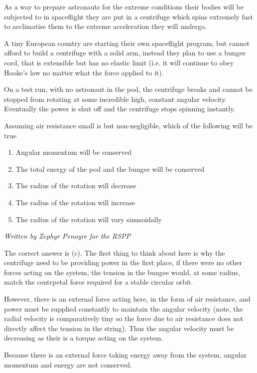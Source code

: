 \begin{problem} 
{
As a way to prepare astronauts for the extreme conditions their bodies will be subjected to in spaceflight they are put in a centrifuge which spins extremely fast to acclimatise them to the extreme acceleration they will undergo.

A tiny European country are starting their own spaceflight program, but cannot afford to build a centrifuge with a solid arm, instead they plan to use a bungee cord, that is extensible but has no elastic limit (i.e. it will continue to obey Hooke's law no matter what the force applied to it).

On a test run, with no astronaut in the pod, the centrifuge breaks and cannot be stopped from rotating at some incredible high, constant angular velocity. Eventually the power is shut off and the centrifuge stops spinning instantly.

Assuming air resistance small is but non-negligible, which of the following will be true

\begin{enumerate}
	\item Angular momentum will be conserved
	\item The total energy of the pod and the bungee will be conserved
	\item The radius of the rotation will decrease
	\item The radius of the rotation will increase
	\item The radius of the rotation will vary sinusoidally
\end{enumerate}
}
{\textit{Written by Zephyr Penoyre for the RSPP}}
{
The correct answer is (c).
The first thing to think about here is why the centrifuge need to be providing power in the first place, if there were no other forces acting on the system, the tension in the bungee would, at some radius, match the centrpetal force required for a stable circular orbit.

However, there is an external force acting here, in the form of air resistance, and power must be supplied constantly to maintain the angular velocity (note, the radial velocity is comparatively tiny so the force due to air resistance does not directly affect the tension in the string). Thus the angular velocity must be decreasing as their is a torque acting on the system.

Because there is an external force taking energy away from the system, angular momentum and energy are not conserved.

}
\end{problem}
